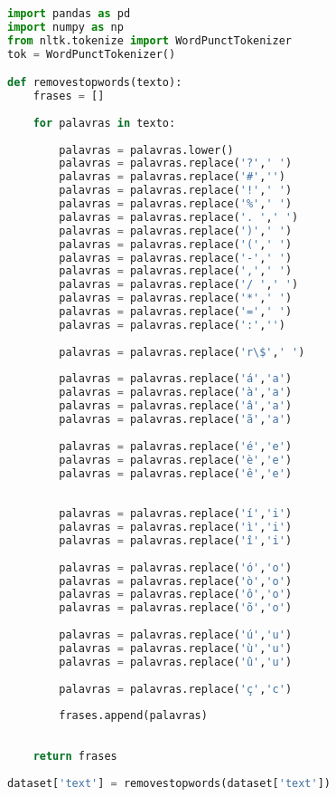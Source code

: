 \begin{lstlisting}[language=Python]
import pandas as pd  
import numpy as np
from nltk.tokenize import WordPunctTokenizer
tok = WordPunctTokenizer()

def removestopwords(texto):
    frases = []
   
    for palavras in texto:
        
        palavras = palavras.lower()
        palavras = palavras.replace('?',' ')
        palavras = palavras.replace('#','')
        palavras = palavras.replace('!',' ')
        palavras = palavras.replace('%',' ')
        palavras = palavras.replace('. ',' ')
        palavras = palavras.replace(')',' ')
        palavras = palavras.replace('(',' ')
        palavras = palavras.replace('-',' ')
        palavras = palavras.replace(',',' ')
        palavras = palavras.replace('/ ',' ')
        palavras = palavras.replace('*',' ')
        palavras = palavras.replace('=',' ')
        palavras = palavras.replace(':','')
        
        palavras = palavras.replace('r\$',' ')
               
        palavras = palavras.replace('á','a')
        palavras = palavras.replace('à','a')
        palavras = palavras.replace('â','a')
        palavras = palavras.replace('ã','a')
        
        palavras = palavras.replace('é','e')
        palavras = palavras.replace('è','e')
        palavras = palavras.replace('ê','e')
        
        
        palavras = palavras.replace('í','i')
        palavras = palavras.replace('ì','i')
        palavras = palavras.replace('î','i')
                       
        palavras = palavras.replace('ó','o')
        palavras = palavras.replace('ò','o')
        palavras = palavras.replace('ô','o')
        palavras = palavras.replace('õ','o')
        
        palavras = palavras.replace('ú','u')
        palavras = palavras.replace('ù','u')
        palavras = palavras.replace('û','u')
               
        palavras = palavras.replace('ç','c')
              
        frases.append(palavras)
                                    
        
    return frases
    
dataset['text'] = removestopwords(dataset['text'])
\end{lstlisting}


